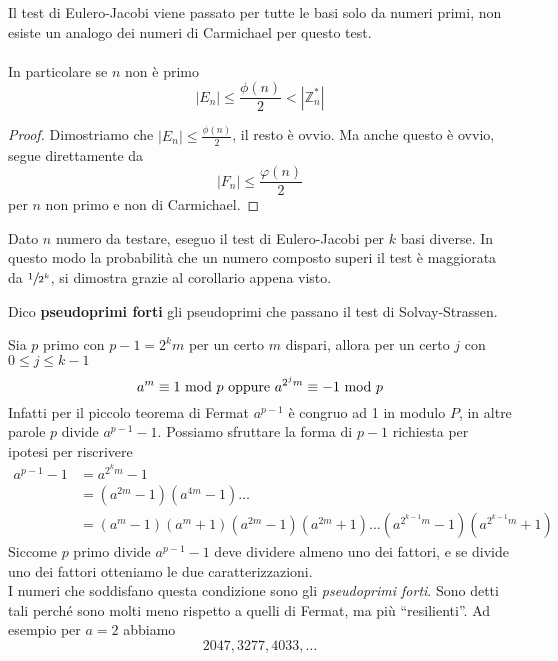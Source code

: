 \begin{corollario}
	Il test di Eulero-Jacobi viene passato per tutte le basi solo da numeri primi, non esiste un analogo dei numeri di Carmichael per questo test. \\ \\ In particolare se $n$ non è primo 
	\begin{equation*}
	\left|E_n\right|\leq\frac{\phi(n)}{2}<\left|\mathbb{Z}_n^*\right|
	\end{equation*}
\end{corollario}
\begin{proof}
	Dimostriamo che $\left|E_n\right|\leq\frac{\phi(n)}{2}$, il resto è ovvio. Ma anche questo è ovvio, segue direttamente da 
	\begin{equation*}
	\left|F_n\right|\leq\frac{\varphi(n)}{2}
	\end{equation*}
	per $n$ non primo e non di Carmichael.
\end{proof}
\begin{teorema}
	Dato $n$ numero da testare, eseguo il test di Eulero-Jacobi per $k$ basi diverse. In questo modo la probabilità che un numero composto superi il test è maggiorata da $\sfrac{1}{2^k}$, si dimostra grazie al corollario appena visto.
\end{teorema}
\begin{definizione}
	Dico \textbf{pseudoprimi forti} gli pseudoprimi che passano il test di Solvay-Strassen.
\end{definizione}
\begin{osservazione} 
	Sia $p$ primo con $p-1=2^km$ per un certo $m$ dispari, allora per un certo $j$ con $0\leq j\leq k-1$
	\begin{equation*}
	a^m\equiv1\Mod p \ \text{oppure} \ a^{2^jm}\equiv-1\Mod p
	\end{equation*}
	Infatti per il piccolo teorema di Fermat $a^{p-1}$ è congruo ad 1 in modulo $P$, in altre parole $p$ divide $a^{p-1}-1$. Possiamo sfruttare la forma di $p-1$ richiesta per ipotesi per riscrivere
	\begin{align*}
	a^{p-1}-1
	&=a^{2^km}-1\\
	&=\left(a^{2m}-1\right)\left(a^{4m}-1\right)\dots\\
	&=\left(a^{m}-1\right)\left(a^{m}+1\right)\left(a^{2m}-1\right)\left(a^{2m}+1\right)\dots\left(a^{2^{k-1}m}-1\right)\left(a^{2^{k-1}m}+1\right)
	\end{align*}
	Siccome $p$ primo divide $a^{p-1}-1$ deve dividere almeno uno dei fattori, e se divide uno dei fattori otteniamo le due caratterizzazioni.
	\\
	I numeri che soddisfano questa condizione sono gli \textit{pseudoprimi forti}. Sono detti tali perché sono molti meno rispetto a quelli di Fermat, ma più \enquote{resilienti}. Ad esempio per $a=2$ abbiamo
	\begin{equation*}
	2047,3277,4033,\dots
	\end{equation*}
\end{osservazione}





